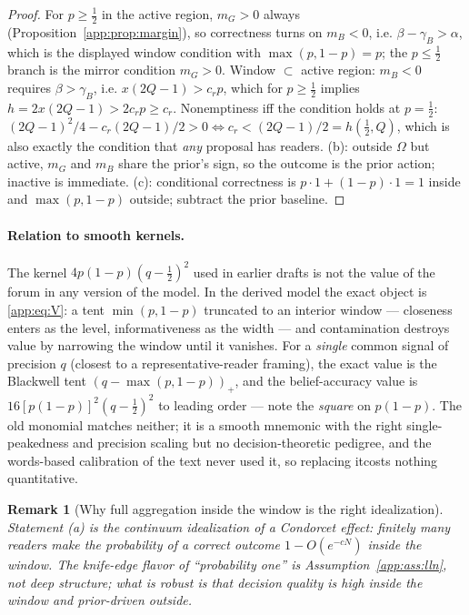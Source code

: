 \documentclass[12pt]{article}
\newtheorem{remark}{Remark}
\begin{document}
\begin{proof}
For $p\ge\tfrac12$ in the active region, $m_G>0$ always
(Proposition~\ref{app:prop:margin}), so correctness turns on $m_B<0$, i.e.
$\beta-\gamma_B>\alpha$, which is the displayed window condition with
$\max(p,1-p)=p$; the $p\le\tfrac12$ branch is the mirror condition $m_G>0$.
Window $\subset$ active region: $m_B<0$ requires $\beta>\gamma_B$, i.e.
$x(2Q-1)>c_rp$, which for $p\ge\tfrac12$ implies $h=2x(2Q-1)>2c_rp\ge c_r$.
Nonemptiness iff the condition holds at $p=\tfrac12$:
$(2Q-1)^2/4-c_r(2Q-1)/2>0\iff c_r<(2Q-1)/2=h(\tfrac12,Q)$, which is also
exactly the condition that \emph{any} proposal has readers. (b): outside
$\Omega$ but active, $m_G$ and $m_B$ share the prior's sign, so the outcome is
the prior action; inactive is immediate. (c): conditional correctness is
$p\cdot1+(1-p)\cdot1=1$ inside and $\max(p,1-p)$ outside; subtract the prior
baseline.
\end{proof}

\paragraph{Relation to smooth kernels.} The kernel
$4p(1-p)(q-\tfrac12)^2$ used in earlier drafts is not the value of the forum in
any version of the model. In the derived model the exact object is
\eqref{app:eq:V}: a tent $\min(p,1-p)$ truncated to an interior window ---
closeness enters as the level, informativeness as the width --- and contamination
destroys value by narrowing the window until it vanishes. For a \emph{single}
common signal of precision $q$ (closest to a representative-reader framing), the
exact value is the Blackwell tent $(q-\max(p,1-p))_+$, and the belief-accuracy
value is $16[p(1-p)]^2(q-\tfrac12)^2$ to leading order --- note the
\emph{square} on $p(1-p)$. The old monomial matches neither; it is a smooth
mnemonic with the right single-peakedness and precision scaling but no
decision-theoretic pedigree, and the words-based calibration of the text never
used it, so replacing itcosts nothing quantitative.

\begin{remark}[Why full aggregation inside the window is the right idealization]
Statement (a) is the continuum idealization of a Condorcet effect: finitely many
readers make the probability of a correct outcome $1-O(e^{-cN})$ inside the
window. The knife-edge flavor of ``probability one'' is Assumption~\ref{app:ass:lln},
not deep structure; what is robust is that decision quality is high inside the
window and prior-driven outside.
\end{remark}
\end{document}
